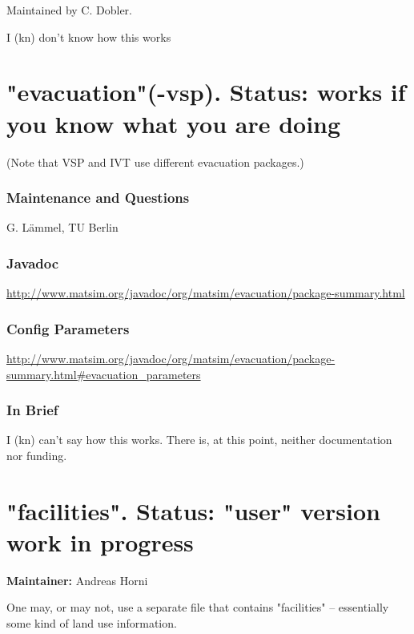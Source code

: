 \documentclass[a4paper,11pt]{report}
\begin{document}
Maintained by C. Dobler.

I (kn) don't know how this works

\vfill\eject
\section{"evacuation"(-vsp). Status: works if you know what you are doing}

(Note that VSP and IVT use different evacuation packages.)

\subsubsection{\textbf{Maintenance and Questions}}

G. Lämmel, TU Berlin

\subsubsection{\textbf{Javadoc}}

\href{http://www.matsim.org/javadoc/org/matsim/evacuation/package-summary.html}{http://www.matsim.org/javadoc/org/matsim/evacuation/package-summary.html}


\subsubsection{\textbf{\textbf{Config Parameters{}}}}

\href{http://www.matsim.org/javadoc/org/matsim/evacuation/package-summary.html#evacuation_parameters}{http://www.matsim.org/javadoc/org/matsim/evacuation/package-summary.html\#evacuation\_parameters}

\subsubsection{\textbf{\textbf{In Brief}}}

I (kn) can't say how this works. There is, at this point, neither documentation nor funding.

\vfill\eject
\section{"facilities". Status: "user" version work in progress}

\textbf{Maintainer:} Andreas Horni

One may, or may not, use a separate file that contains "facilities" – essentially some kind of land use information.
\end{document}
